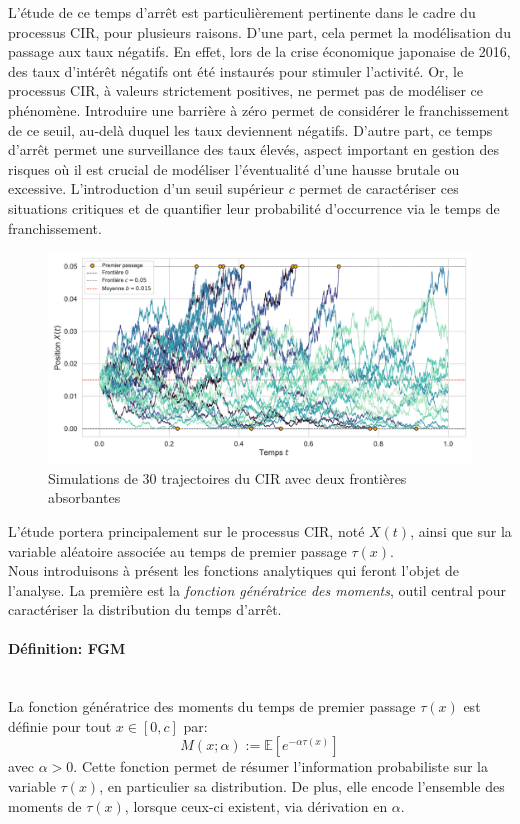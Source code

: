 L'étude de ce temps d'arrêt est particulièrement pertinente dans le cadre du processus \acs{CIR}, pour plusieurs raisons. D'une part, cela permet la modélisation du passage aux taux négatifs. En effet, lors de la crise économique japonaise de 2016, des taux d'intérêt négatifs ont été instaurés pour stimuler l'activité. Or, le processus \acs{CIR}, à valeurs strictement positives, ne permet pas de modéliser ce phénomène. Introduire une barrière à zéro permet de considérer le franchissement de ce seuil, au-delà duquel les taux deviennent négatifs. D'autre part, ce temps d'arrêt permet une surveillance des taux élevés, aspect important en gestion des risques où il est crucial de modéliser l'éventualité d'une hausse brutale ou excessive. L'introduction d'un seuil supérieur $c$ permet de caractériser ces situations critiques et de quantifier leur probabilité d'occurrence via le temps de franchissement.
\begin{figure}[htb]
    \centering
    \includegraphics[width=0.9\linewidth]{img/intro/cir_first_passage.pdf}
    \caption{Simulations de 30 trajectoires du \acs{CIR} avec deux frontières absorbantes}\label{fig:FPTCIR}
\end{figure}
\FloatBarrier L'étude portera principalement sur le processus \acs{CIR}, noté $X(t)$, ainsi que sur la variable aléatoire associée au temps de premier passage $\tau(x)$.\\
Nous introduisons à présent les fonctions analytiques qui feront l'objet de l'analyse. La première est la \textit{fonction génératrice des moments}, outil central pour caractériser la distribution du temps d'arrêt.\pagebreak
\paragraph{Définition: \ac{FGM}}\mbox{}\\
La fonction génératrice des moments du temps de premier passage $\tau(x)$ est définie pour tout \(x\in[0,c]\) par:
\begin{equation}\label{fgm}
    M(x;\alpha):= \mathds{E} \left[ e^{-\alpha \tau(x)} \right]
\end{equation}
avec \(\alpha>0\).
Cette fonction permet de résumer l'information probabiliste sur la variable $\tau(x)$, en particulier sa distribution. De plus, elle encode l'ensemble des moments de $\tau(x)$, lorsque ceux-ci existent, via dérivation en $\alpha$. 

